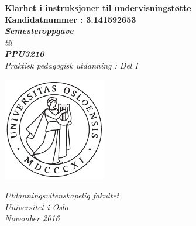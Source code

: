 \documentclass[main.tex]{subfiles}
\begin{document}
\thispagestyle{empty}
\begin{center}        %
  \vspace{5mm}          %
  \LARGE
  \textbf{Klarhet i instruksjoner til undervisningst\o tte} \\
  \Large
  \vspace{10mm}
  \large
  \textbf{Kandidatnummer : 3.141592653} \\
  \vspace{25mm}
  \Large
  {\bf{\textsl{Semesteroppgave}}} \\
  \textsl{til} \\
  \vspace{2mm}
  {\bf{\textsl{PPU3210}}} \\
  \vspace{5mm}
  {\large \textsl {Praktisk pedagogisk utdanning : Del I}}\\
  \vspace{10mm}
  \centerline{\includegraphics[width=45mm,height=45mm]{../figures/uiosegl.pdf}} 
  \vspace{8mm}
  \textsl{Utdanningsvitenskapelig fakultet} \\
  \textsl{Universitet i Oslo} \\
  \vspace{5mm}
  \large
  \textsl{November 2016} \\
\end{center}
\end{document}
